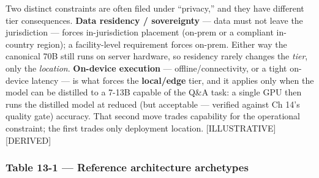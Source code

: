 Two distinct constraints are often filed under ``privacy,'' and they
have different tier consequences. \textbf{Data residency / sovereignty}
--- data must not leave the jurisdiction --- forces in-jurisdiction
placement (on-prem or a compliant in-country region); a facility-level
requirement forces on-prem. Either way the canonical 70B still runs on
server hardware, so residency rarely changes the \emph{tier}, only the
\emph{location}. \textbf{On-device execution} --- offline/connectivity,
or a tight on-device latency --- is what forces the \textbf{local/edge}
tier, and it applies only when the model can be distilled to a 7-13B
capable of the Q\&A task: a single GPU then runs the distilled model at
reduced (but acceptable --- verified against Ch 14's quality gate)
accuracy. That second move trades capability for the operational
constraint; the first trades only deployment location.
\mbox{{[}ILLUSTRATIVE{]}}\hspace{0pt}\mbox{{[}DERIVED{]}}

\subsubsection{Table 13-1 --- Reference architecture
archetypes}\label{table-13-1-reference-architecture-archetypes}

